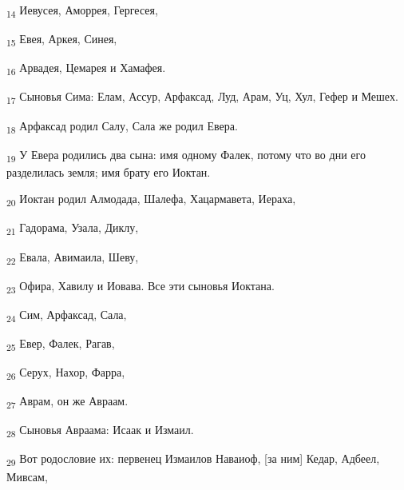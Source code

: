 \begin{tcolorbox}
\textsubscript{14} Иевусея, Аморрея, Гергесея,
\end{tcolorbox}
\begin{tcolorbox}
\textsubscript{15} Евея, Аркея, Синея,
\end{tcolorbox}
\begin{tcolorbox}
\textsubscript{16} Арвадея, Цемарея и Хамафея.
\end{tcolorbox}
\begin{tcolorbox}
\textsubscript{17} Сыновья Сима: Елам, Ассур, Арфаксад, Луд, Арам, Уц, Хул, Гефер и Мешех.
\end{tcolorbox}
\begin{tcolorbox}
\textsubscript{18} Арфаксад родил Салу, Сала же родил Евера.
\end{tcolorbox}
\begin{tcolorbox}
\textsubscript{19} У Евера родились два сына: имя одному Фалек, потому что во дни его разделилась земля; имя брату его Иоктан.
\end{tcolorbox}
\begin{tcolorbox}
\textsubscript{20} Иоктан родил Алмодада, Шалефа, Хацармавета, Иераха,
\end{tcolorbox}
\begin{tcolorbox}
\textsubscript{21} Гадорама, Узала, Диклу,
\end{tcolorbox}
\begin{tcolorbox}
\textsubscript{22} Евала, Авимаила, Шеву,
\end{tcolorbox}
\begin{tcolorbox}
\textsubscript{23} Офира, Хавилу и Иовава. Все эти сыновья Иоктана.
\end{tcolorbox}
\begin{tcolorbox}
\textsubscript{24} Сим, Арфаксад, Сала,
\end{tcolorbox}
\begin{tcolorbox}
\textsubscript{25} Евер, Фалек, Рагав,
\end{tcolorbox}
\begin{tcolorbox}
\textsubscript{26} Серух, Нахор, Фарра,
\end{tcolorbox}
\begin{tcolorbox}
\textsubscript{27} Аврам, он же Авраам.
\end{tcolorbox}
\begin{tcolorbox}
\textsubscript{28} Сыновья Авраама: Исаак и Измаил.
\end{tcolorbox}
\begin{tcolorbox}
\textsubscript{29} Вот родословие их: первенец Измаилов Наваиоф, [за ним] Кедар, Адбеел, Мивсам,
\end{tcolorbox}
